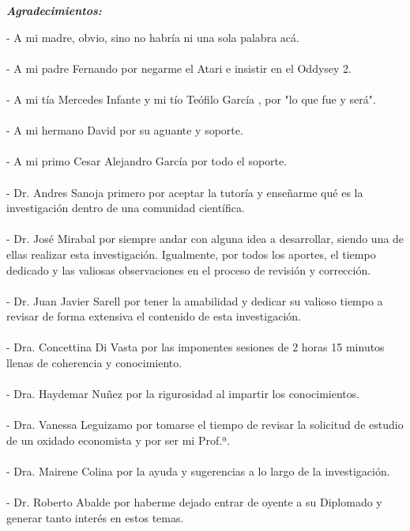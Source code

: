 \documentclass[
  12pt,
  openany]{book}
\begin{document}
\newpage
\begin{center}
\large{\textbf{\emph{\Huge{Agradecimientos:}}}}
\end{center}
\thispagestyle{empty}
\vspace*{2cm}
\thispagestyle{empty}

- A mi madre, obvio, sino no habría ni una sola palabra acá.\\\\
- A mi padre Fernando por negarme el Atari e insistir en el Oddysey 2.\\\\
- A mi tía Mercedes Infante y mi tío Teófilo García \textdagger, por "lo que fue y será".\\\\
- A mi hermano David por su aguante y soporte.\\\\
- A mi primo Cesar Alejandro García por todo el soporte.\\\\
- Dr. Andres Sanoja primero por aceptar la tutoría y enseñarme qué es la investigación dentro de una comunidad científica.\\\\
- Dr. José Mirabal por siempre andar con alguna idea a desarrollar, siendo una de ellas realizar esta investigación. Igualmente, por todos los aportes, el tiempo dedicado y las valiosas observaciones en el proceso de revisión y corrección.\\\\
- Dr. Juan Javier Sarell por tener la amabilidad y dedicar su valioso tiempo a revisar de forma extensiva el contenido de esta investigación.\\\\
- Dra. Concettina Di Vasta por las imponentes sesiones de 2 horas 15 minutos llenas de coherencia y conocimiento.\\\\
- Dra. Haydemar Nuñez por la rigurosidad al impartir los conocimientos.\\\\
- Dra. Vanessa Leguizamo por tomarse el tiempo de revisar la solicitud de estudio de un oxidado economista y por ser mi Prof.ª.\\\\
- Dra. Mairene Colina por la ayuda y sugerencias a lo largo de la investigación.\\\\
- Dr. Roberto Abalde por haberme dejado entrar de oyente a su Diplomado y generar tanto interés en estos temas.\\\\
\end{document}

